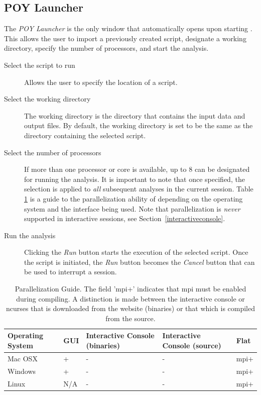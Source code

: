 \subsection{POY Launcher} 
The \emph{POY Launcher} is the only window that automatically opens upon starting \poy. This allows the user to 
import a previously created script, designate a working directory, specify the number of processors, and start the analysis.

\begin{description}
	\item[Select the script to run] 
	Allows the user to specify the location of a \poy script.
	\item[Select the working directory] 
	The working directory is the directory that contains 
	the input data and output files. By default, the working directory is set to be the same 
	as the directory containing the selected \poy script. 
	\item[Select the number of processors] 
	If more than one processor or core is available, up to 
	8 can be designated for running the analysis. It is important to note that once specified, the 
	selection is applied to \emph{all} subsequent analyses in the current \poy session. 
	Table \ref{ParallelizationGuide} is a 
	guide to the parallelization ability of \poy depending on the operating system and the \poy interface 
	being used. Note that parallelization is \emph{never} supported in interactive sessions, see 
	Section~\ref{interactiveconsole}.
    	\item[Run the analysis] 
	Clicking the \emph{Run} button starts the execution of the selected script. 
	Once the script is initiated, the \emph{Run} button becomes the \emph{Cancel} button that can be 
	used to interrupt a \poy session.
\end{description}

\begin{table}[t] 
\small
\caption{Parallelization Guide. The field 'mpi+' indicates that mpi must be enabled during compiling. A distinction is made between the interactive console or ncurses that is downloaded from the website (binaries) or that which is compiled from the source.}
\label{ParallelizationGuide} 
\begin{center}
\renewcommand{\arraystretch}{1.5}
\begin{tabular}{p{3.0cm}  p{1.0cm}  p{2.60cm}  p{2.60cm}  p{1.0cm}} 
\hline
	Operating System & GUI & Interactive Console (binaries) & Interactive Console (source) & Flat \\
\hline
	Mac OSX & + & - & - & mpi+ \\
	Windows & + & - & - & mpi+ \\
	Linux & N/A & - & - & mpi+ \\
\hline
\end{tabular}
\end{center}
\end{table}

